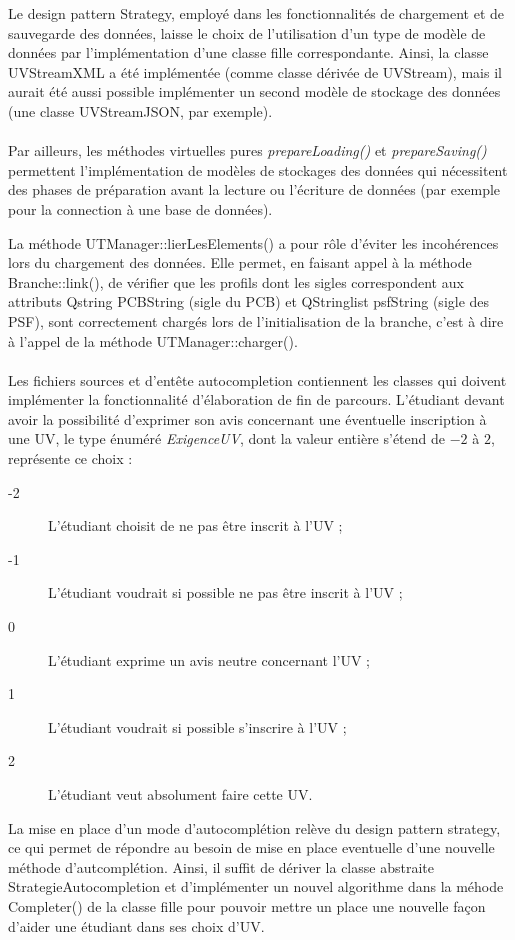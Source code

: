 \documentclass[a4paper,10pt,french]{report}
\begin{document}
	Le design pattern Strategy, employé dans les fonctionnalités de chargement et de sauvegarde des données, laisse le choix de l'utilisation d'un type de modèle de données par l'implémentation d'une classe fille correspondante.
	Ainsi, la classe UVStreamXML a été implémentée (comme classe dérivée de UVStream), mais il aurait été aussi possible implémenter un second modèle de stockage des données (une classe UVStreamJSON, par exemple).\\\\
	Par ailleurs, les méthodes virtuelles pures \emph{prepareLoading()} et \emph{prepareSaving()} permettent l'implémentation de modèles de stockages des données qui nécessitent des phases de préparation avant la lecture ou l'écriture de données (par exemple pour la connection à une base de données).
	
	La méthode UTManager::lierLesElements() a pour rôle d'éviter les incohérences lors du chargement des données.
	Elle permet, en faisant appel à la méthode Branche::link(), de vérifier que les profils dont les sigles correspondent aux attributs Qstring PCBString (sigle du PCB) et QStringlist psfString (sigle des PSF), sont correctement chargés lors de l'initialisation de la branche, c'est à dire à l'appel de la méthode UTManager::charger().\\\\
	
	
	Les fichiers sources et d'entête autocompletion contiennent les classes qui doivent implémenter la fonctionnalité d'élaboration de fin  de parcours.
	L'étudiant devant avoir la possibilité d'exprimer son avis concernant une éventuelle inscription à une UV, le type énuméré \emph{ExigenceUV}, dont la valeur entière s'étend de $-2$ à $2$, représente ce choix : 
	\begin{description}
	\item[-2] L'étudiant choisit de ne pas être inscrit à l'UV ;
	\item[-1] L'étudiant voudrait si possible ne pas être inscrit à l'UV ;	
	\item[0] L'étudiant exprime un avis neutre concernant l'UV ;
	\item[1] L'étudiant voudrait si possible s'inscrire à l'UV ;
	\item[2] L'étudiant veut absolument faire cette UV.
	\end{description}
	
	La mise en place d'un mode d'autocomplétion relève du design pattern strategy, ce qui permet de répondre au besoin de mise en place eventuelle d'une nouvelle méthode d'autcomplétion.
	Ainsi, il suffit de dériver la classe abstraite StrategieAutocompletion et d'implémenter un nouvel algorithme dans la méhode Completer() de la classe fille pour pouvoir mettre un place une nouvelle façon d'aider une étudiant dans ses choix d'UV.\\\\
	
\end{document}
